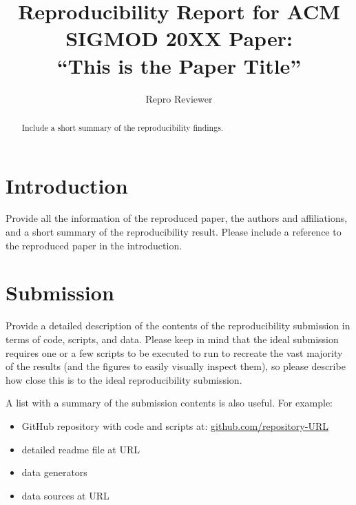\documentclass[acmsmall,nonacm]{acmart}
\begin{document}
\newcommand\papertitle[0]{This is the Paper Title}
\title[ARI Report for ``\papertitle'']{Reproducibility Report for ACM SIGMOD 20XX Paper:\\ ``\papertitle''}

\author{Repro Reviewer}



\begin{abstract}
Include a short summary of the reproducibility findings.
\end{abstract}




\maketitle


\section{Introduction}
Provide all the information of the reproduced paper, the authors and affiliations, and a short summary of the reproducibility result. Please include a reference to the reproduced paper in the introduction.

\section{Submission} 
Provide a detailed description of the contents of the reproducibility submission in terms of code, scripts, and data. Please keep in mind that the ideal submission requires one or a few scripts to be executed to run to recreate the vast majority of the results (and the figures to easily visually inspect them), so please describe how close this is to the ideal reproducibility submission. 

A list with a summary of the submission contents is also useful. For example:
\begin{itemize}
\item GitHub repository with code and scripts at: \url{github.com/repository-URL}
\item detailed readme file at URL
\item data generators
\item data sources at URL	
\end{itemize}
\end{document}
